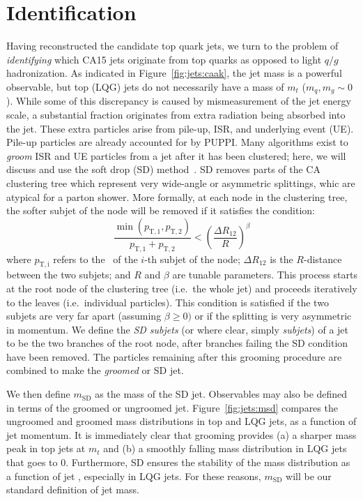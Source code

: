 \section{Identification}
\label{sec:jets:id}

Having reconstructed the candidate top quark jets, we turn to the problem of \emph{identifying} which CA15 jets originate from top quarks as opposed to light $q/g$ hadronization. 
As indicated in Figure~\ref{fig:jets:caak}, the jet mass is a powerful observable, but top (LQG) jets do not necessarily have a mass of $m_t$ ($m_q,m_g\sim 0$). 
While some of this discrepancy is caused by mismeasurement of the jet energy scale, a substantial fraction originates from extra radiation being absorbed into the jet.
These extra particles arise from pile-up, ISR, and underlying event (UE).
Pile-up particles are already accounted for by PUPPI.
Many algorithms exist to \emph{groom} ISR and UE particles from a jet after it has been clustered; here, we will discuss and use the soft drop (SD) method~\cite{sd}.
SD removes parts of the CA clustering tree which represent very wide-angle or asymmetric splittings, whic are atypical for a parton shower.
More formally, at each node in the clustering tree, the softer subjet of the node will be removed if it satisfies the condition:
\begin{equation}
    \frac{\min(p_\mathrm{T,1},p_\mathrm{T,2})}{p_\mathrm{T,1}+p_\mathrm{T,2}} < 
    \left(\frac{\Delta R_{12}}{R}\right)^\beta
\end{equation}
where $p_\mathrm{T,i}$ refers to the \pt~of the $i$-th subjet of the node; $\Delta R_{12}$ is the $R$-distance between the two subjets; and $R$ and $\beta$ are tunable parameters. 
This process starts at the root node of the clustering tree (i.e.~the whole jet) and proceeds iteratively to the leaves (i.e.~individual particles).
This condition is satisfied if the two subjets are very far apart (assuming $\beta \geq 0)$ or if the splitting is very asymmetric in momentum. 
We define the \emph{SD subjets} (or where clear, simply \emph{subjets}) of a jet to be the two branches of the root node, after branches failing the SD condition have been removed. 
The particles remaining after this grooming procedure are combined to make the \emph{groomed} or SD jet. 

We then define $m_\mathrm{SD}$ as the mass of the SD jet. 
Observables may also be defined in terms of the groomed or ungroomed jet. 
Figure~\ref{fig:jets:msd} compares the ungroomed and groomed mass distributions in top and LQG jets, as a function of jet momentum. 
It is immediately clear that grooming provides (a) a sharper mass peak in top jets at $m_t$ and (b) a smoothly falling mass distribution in LQG jets that goes to 0.
Furthermore, SD ensures the stability of the mass distribution as a function of jet \pt, especially in LQG jets.
For these reasons, $m_\mathrm{SD}$ will be our standard definition of jet mass. 


